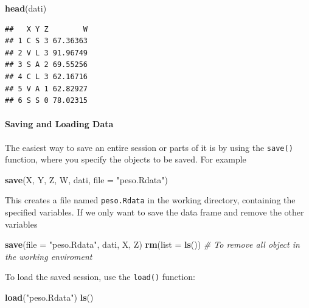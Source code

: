 \documentclass[
]{article}
\newenvironment{Shaded}{\begin{snugshade}}{\end{snugshade}}
\newcommand{\AttributeTok}[1]{\textcolor[rgb]{0.13,0.29,0.53}{#1}}
\newcommand{\CommentTok}[1]{\textcolor[rgb]{0.56,0.35,0.01}{\textit{#1}}}
\newcommand{\FunctionTok}[1]{\textcolor[rgb]{0.13,0.29,0.53}{\textbf{#1}}}
\newcommand{\NormalTok}[1]{#1}
\newcommand{\StringTok}[1]{\textcolor[rgb]{0.31,0.60,0.02}{#1}}
\begin{document}
\begin{Shaded}
\begin{Highlighting}[]
\FunctionTok{head}\NormalTok{(dati)}
\end{Highlighting}
\end{Shaded}

\begin{verbatim}
##   X Y Z        W
## 1 C S 3 67.36363
## 2 V L 3 91.96749
## 3 S A 2 69.55256
## 4 C L 3 62.16716
## 5 V A 1 62.82927
## 6 S S 0 78.02315
\end{verbatim}

\hypertarget{saving-and-loading-data}{%
\paragraph{Saving and Loading Data}\label{saving-and-loading-data}}

The easiest way to save an entire session or parts of it is by using the
\texttt{save()} function, where you specify the objects to be saved. For
example

\begin{Shaded}
\begin{Highlighting}[]
\FunctionTok{save}\NormalTok{(X, Y, Z, W, dati, }\AttributeTok{file =} \StringTok{"peso.Rdata"}\NormalTok{)}
\end{Highlighting}
\end{Shaded}

This creates a file named \texttt{peso.Rdata} in the working directory,
containing the specified variables. If we only want to save the data
frame and remove the other variables

\begin{Shaded}
\begin{Highlighting}[]
\FunctionTok{save}\NormalTok{(}\AttributeTok{file =} \StringTok{"peso.Rdata"}\NormalTok{, dati, X, Z)}
\FunctionTok{rm}\NormalTok{(}\AttributeTok{list =} \FunctionTok{ls}\NormalTok{()) }\CommentTok{\# To remove all object in the working enviroment}
\end{Highlighting}
\end{Shaded}

To load the saved session, use the \texttt{load()} function:

\begin{Shaded}
\begin{Highlighting}[]
\FunctionTok{load}\NormalTok{(}\StringTok{"peso.Rdata"}\NormalTok{)}
\FunctionTok{ls}\NormalTok{()}
\end{Highlighting}
\end{Shaded}
\end{document}
